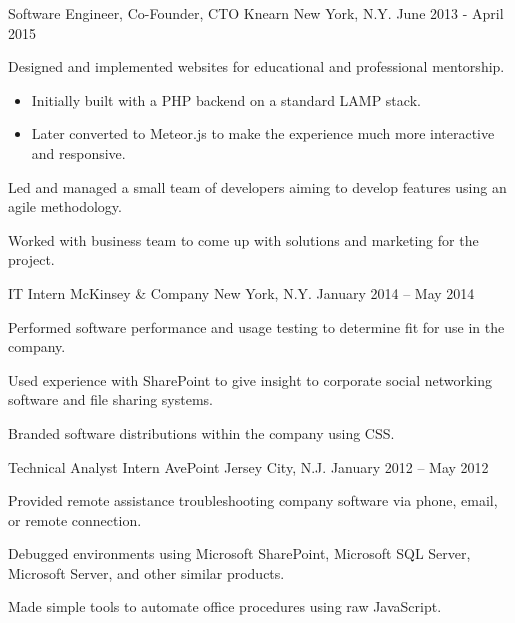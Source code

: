 \begin{cventries}
  \cventry
    {Software Engineer, Co-Founder, CTO} %
    {Knearn} %
    {New York, N.Y.} %
    {June 2013 - April 2015} %
    {
      \begin{cvitems} %
        \item {Designed and implemented websites for educational and professional mentorship.}
        \begin{itemize}
          \item {Initially built with a PHP backend on a standard LAMP stack.}
          \item {Later converted to Meteor.js to make the experience much more interactive and responsive.}
        \end{itemize}
        \item {Led and managed a small team of developers aiming to develop features using an agile methodology.}
        \item {Worked with business team to come up with solutions and marketing for the project.}
      \end{cvitems}
    }

  \cventry
    {IT Intern} %
    {McKinsey \& Company} %
    {New York, N.Y.} %
    {January 2014 – May 2014} %
    {
      \begin{cvitems} %
        \item {Performed software performance and usage testing to determine fit for use in the company.}
        \item {Used experience with SharePoint to give insight to corporate social networking software and file sharing systems.}
        \item {Branded software distributions within the company using CSS.}
      \end{cvitems}
    }

  \cventry
    {Technical Analyst Intern} %
    {AvePoint} %
    {Jersey City, N.J.} %
    {January 2012 – May 2012} %
    {
      \begin{cvitems} %
        \item {Provided remote assistance troubleshooting company software via phone, email, or remote connection.}
        \item {Debugged environments using Microsoft SharePoint, Microsoft SQL Server, Microsoft Server, and other similar products.}
        \item {Made simple tools to automate office procedures using raw JavaScript.}
      \end{cvitems}
    }


\end{cventries}
